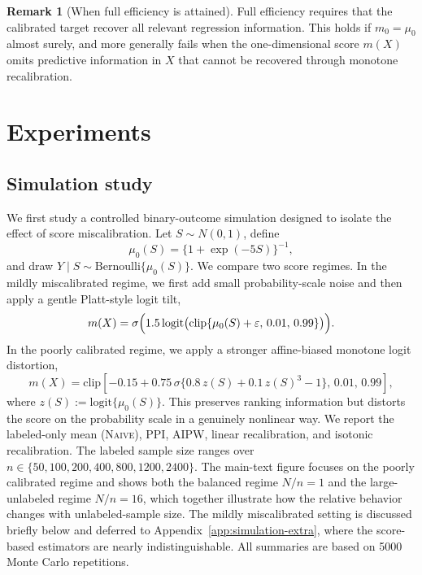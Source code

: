 \documentclass{article}
\theoremstyle{plain}
\theoremstyle{definition}
\newtheorem{remark}{Remark}
\newcommand{\1}{\mathbbm{1}}
\begin{document}
\begin{remark}[When full efficiency is attained]
Full efficiency requires that the calibrated target recover all relevant regression information. This holds if \(m_0=\mu_0\) almost surely, and more generally fails when the one-dimensional score \(m(X)\) omits predictive information in \(X\) that cannot be recovered through monotone recalibration.
\end{remark}



 

 
 

\section{Experiments}
\label{sec:exp}

\subsection{Simulation study}
 
\label{sec:simulation}
We first study a controlled binary-outcome simulation designed to isolate the effect of score miscalibration. Let \(S\sim N(0,1)\), define
\[
\mu_0(S)=\{1+\exp(-5S)\}^{-1},
\]
and draw \(Y\mid S\sim \mathrm{Bernoulli}\{\mu_0(S)\}\). We compare two score regimes. In the mildly miscalibrated regime, we first add small probability-scale noise and then apply a gentle Platt-style logit tilt,
\[
m(X)=\sigma\Bigl(1.5\,\mathrm{logit}\bigl(\mathrm{clip}\{\mu_0(S)+\varepsilon,\,0.01,\,0.99\}\bigr)\Bigr).
\]
In the poorly calibrated regime, we apply a stronger affine-biased monotone logit distortion,
\[
m(X)=\mathrm{clip}\left[-0.15+0.75\,\sigma\bigl\{0.8\,z(S)+0.1\,z(S)^3-1\bigr\},\,0.01,\,0.99\right],
\]
where \(z(S):=\mathrm{logit}\{\mu_0(S)\}\). This preserves ranking information but distorts the score on the probability scale in a genuinely nonlinear way. We report the labeled-only mean (\textsc{Naive}), PPI, AIPW, linear recalibration, and isotonic recalibration. The labeled sample size ranges over \(n\in\{50,100,200,400,800,1200,2400\}\). The main-text figure focuses on the poorly calibrated regime and shows both the balanced regime \(N/n=1\) and the large-unlabeled regime \(N/n=16\), which together illustrate how the relative behavior changes with unlabeled-sample size. The mildly miscalibrated setting is discussed briefly below and deferred to Appendix~\ref{app:simulation-extra}, where the score-based estimators are nearly indistinguishable. All summaries are based on 5000 Monte Carlo repetitions.
\end{document}
